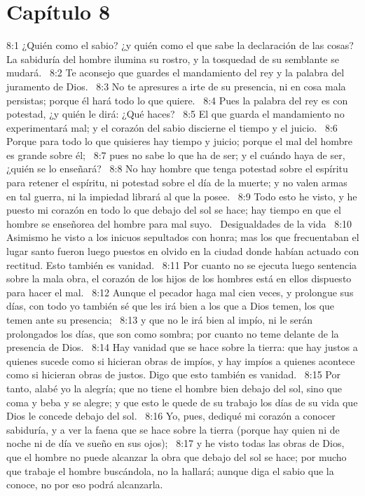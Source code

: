 \section*{Capítulo 8 }

8:1 ¿Quién como el sabio? ¿y quién como el que sabe la declaración de las cosas? La sabiduría del hombre ilumina su rostro, y la tosquedad de su semblante se mudará.  
8:2 Te aconsejo que guardes el mandamiento del rey y la palabra del juramento de Dios.  
8:3 No te apresures a irte de su presencia, ni en cosa mala persistas; porque él hará todo lo que quiere.  
8:4 Pues la palabra del rey es con potestad, ¿y quién le dirá: ¿Qué haces?  
8:5 El que guarda el mandamiento no experimentará mal; y el corazón del sabio discierne el tiempo y el juicio.  
8:6 Porque para todo lo que quisieres hay tiempo y juicio; porque el mal del hombre es grande sobre él;  
8:7 pues no sabe lo que ha de ser; y el cuándo haya de ser, ¿quién se lo enseñará?  
8:8 No hay hombre que tenga potestad sobre el espíritu para retener el espíritu, ni potestad sobre el día de la muerte; y no valen armas en tal guerra, ni la impiedad librará al que la posee.  
8:9 Todo esto he visto, y he puesto mi corazón en todo lo que debajo del sol se hace; hay tiempo en que el hombre se enseñorea del hombre para mal suyo.  
Desigualdades de la vida  
8:10 Asimismo he visto a los inicuos sepultados con honra; mas los que frecuentaban el lugar santo fueron luego puestos en olvido en la ciudad donde habían actuado con rectitud. Esto también es vanidad.  
8:11 Por cuanto no se ejecuta luego sentencia sobre la mala obra, el corazón de los hijos de los hombres está en ellos dispuesto para hacer el mal.  
8:12 Aunque el pecador haga mal cien veces, y prolongue sus días, con todo yo también sé que les irá bien a los que a Dios temen, los que temen ante su presencia;  
8:13 y que no le irá bien al impío, ni le serán prolongados los días, que son como sombra; por cuanto no teme delante de la presencia de Dios.  
8:14 Hay vanidad que se hace sobre la tierra: que hay justos a quienes sucede como si hicieran obras de impíos, y hay impíos a quienes acontece como si hicieran obras de justos. Digo que esto también es vanidad.  
8:15 Por tanto, alabé yo la alegría; que no tiene el hombre bien debajo del sol, sino que coma y beba y se alegre; y que esto le quede de su trabajo los días de su vida que Dios le concede debajo del sol.  
8:16 Yo, pues, dediqué mi corazón a conocer sabiduría, y a ver la faena que se hace sobre la tierra (porque hay quien ni de noche ni de día ve sueño en sus ojos);  
8:17 y he visto todas las obras de Dios, que el hombre no puede alcanzar la obra que debajo del sol se hace; por mucho que trabaje el hombre buscándola, no la hallará; aunque diga el sabio que la conoce, no por eso podrá alcanzarla.  
